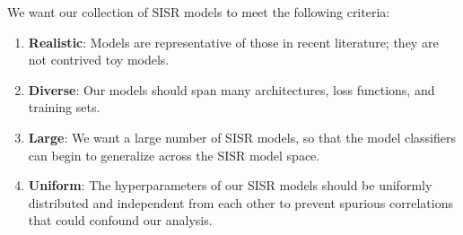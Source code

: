 \documentclass[10pt]{article} %
\begin{document}
We want our collection of SISR models to meet the following criteria:
\begin{enumerate}
    \item \textbf{Realistic}: Models are representative of those in recent literature; they are not contrived toy models.
    \item \textbf{Diverse}: Our models should span many architectures, loss functions, and training sets.
    \item \textbf{Large}: We want a large number of SISR models, so that the model classifiers can begin to generalize across the SISR model space.
    \item \textbf{Uniform}: The hyperparameters of our SISR models should be uniformly distributed and independent from each other to prevent spurious correlations that could confound our analysis.
\end{enumerate}
\end{document}
